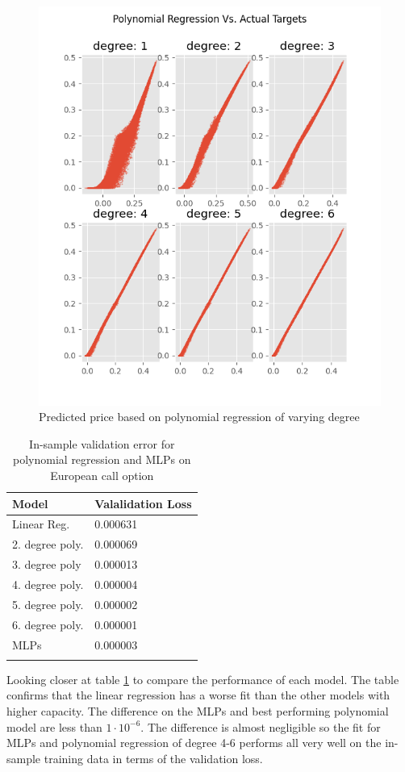 \begin{figure}[H]
\centering
\includegraphics{Figures/polynomialEuroC.png}
\decoRule
\caption[Polynomial Regression Predictions Vs. Actual Prices]{Predicted price based on polynomial regression of varying degree}
\label{fig:PolynomialEuroC}
\end{figure}

\begin{table}[th]
\caption{In-sample validation error for polynomial regression and MLPs on European call option}
\label{tab:euroPerformance}
\centering
\begin{tabular}{l l}
\toprule
\textbf{Model} & \textbf{Valalidation Loss} \\
\midrule
Linear Reg. & 0.000631 \\
2. degree  poly.  & 0.000069 \\
3. degree poly & 0.000013\\
4. degree poly.  & 0.000004 \\
5. degree poly.  & 0.000002 \\
6. degree poly. & 0.000001\\
MLPs        & 0.000003\\
\bottomrule\\
\end{tabular}
\end{table}
Looking closer at table \ref{tab:euroPerformance} to compare the performance of each model. The table confirms that the linear regression has a worse fit than the other models with higher capacity. The difference on the MLPs and best performing polynomial model are less than $1\cdot 10^{-6}$. The difference is almost negligible so the fit for MLPs and polynomial regression of degree 4-6 performs all very well on the in-sample training data in terms of the validation loss.

